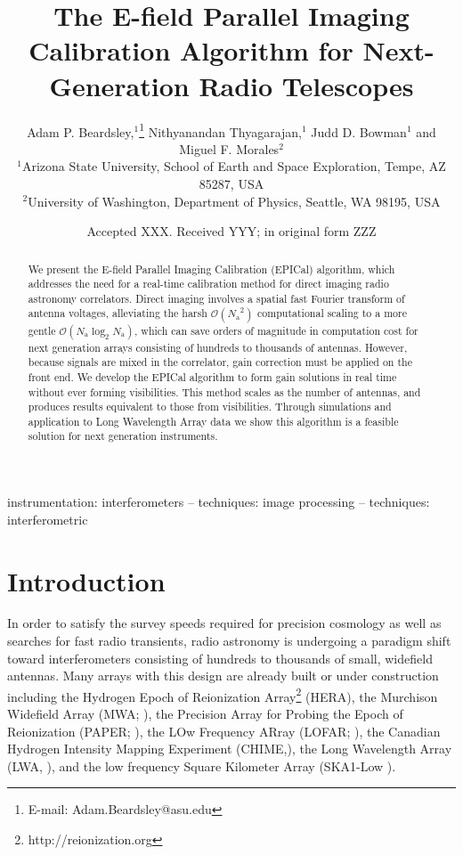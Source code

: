 \documentclass[a4paper,fleqn,usenatbib]{../mnras}
\title[EPICal]{The E-field Parallel Imaging Calibration Algorithm for Next-Generation Radio Telescopes}
\author[Beardsley et al.]{
Adam P. Beardsley,$^{1}$\thanks{E-mail: Adam.Beardsley@asu.edu}
Nithyanandan Thyagarajan,$^{1}$
Judd D. Bowman$^{1}$
\newauthor
and Miguel F. Morales$^{2}$
\\
$^{1}$Arizona State University, School of Earth and Space Exploration, Tempe, AZ 85287, USA\\
$^{2}$University of Washington, Department of Physics, Seattle, WA 98195, USA\\
}
\date{Accepted XXX. Received YYY; in original form ZZZ}
\newcommand{\Nant}{\ensuremath{N_{\mathrm{a}}}}
\begin{document}
\label{firstpage}
\pagerange{\pageref{firstpage}--\pageref{lastpage}}
\maketitle

\begin{abstract}
We present the E-field Parallel Imaging Calibration (EPICal) algorithm, which addresses the need for a real-time calibration method for direct imaging radio astronomy correlators. Direct imaging involves a spatial fast Fourier transform of antenna voltages, alleviating the harsh $\mathcal{O}(\Nant^2)$ computational scaling to a more gentle $\mathcal{O}(\Nant \log_2 \Nant)$, which can save orders of magnitude in computation cost for next generation arrays consisting of hundreds to thousands of antennas. However, because signals are mixed in the correlator, gain correction must be applied on the front end. We develop the EPICal algorithm to form gain solutions in real time without ever forming visibilities. This method scales as the number of antennas, and produces results equivalent to those from visibilities. Through simulations and application to Long Wavelength Array data we show this algorithm is a feasible solution for next generation instruments.
\end{abstract}

\begin{keywords}
instrumentation: interferometers -- techniques: image processing -- techniques: interferometric
\end{keywords}



\section{Introduction}
In order to satisfy the survey speeds required for precision cosmology as well as searches for fast radio transients, radio astronomy is undergoing a paradigm shift toward interferometers consisting of hundreds to thousands of small, widefield antennas. Many arrays with this design are already built or under construction including the Hydrogen Epoch of Reionization Array\footnote{http://reionization.org} (HERA), the Murchison Widefield Array (MWA; \citealt{tin13,bow13}), the Precision Array for Probing the Epoch of Reionization (PAPER; \citealt{par10}), the LOw Frequency ARray (LOFAR; \citealt{van13}), the Canadian Hydrogen Intensity Mapping Experiment (CHIME,\citealt{ban14}), the Long Wavelength Array (LWA, \citealt{ell13}), and the low frequency Square Kilometer Array (SKA1-Low \citealt{mel13}).
\end{document}

